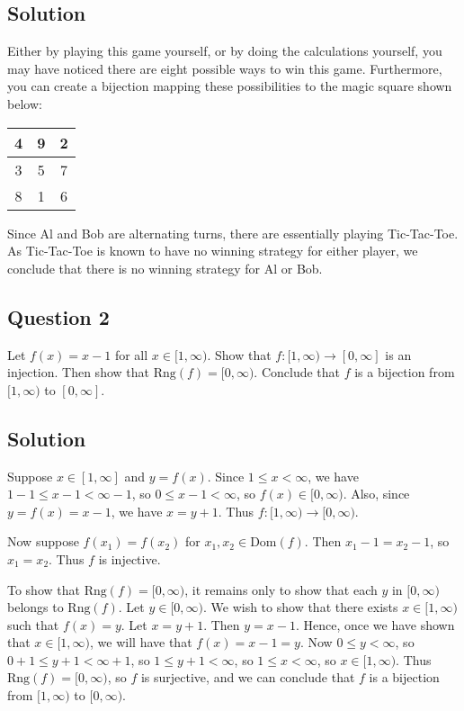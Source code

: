 \documentclass{article}
\begin{document}

\subsection*{Solution}
    Either by playing this game yourself, or by doing the calculations yourself, you may have noticed there are eight possible ways to win this game. Furthermore, you can create a bijection mapping these possibilities to the magic square shown below:
    \begin{center}
        \begin{tabular}{c|c|c}
            4 & 9 & 2 \\
             \hline
            3 & 5 & 7 \\
             \hline
            8 & 1 & 6
        \end{tabular}
    \end{center}
    Since Al and Bob are alternating turns, there are essentially playing Tic-Tac-Toe. As Tic-Tac-Toe is known to have no winning strategy for either player, we conclude that there is no winning strategy for Al or Bob.

\subsection*{Question 2}
    Let $f(x) = x - 1$ for all $x \in [1, \infty)$. Show that $f: [1, \infty) \rightarrow [0, \infty]$ is an injection. Then show that $\text{Rng}(f) = [0, \infty)$. Conclude that $f$ is a bijection from $[1, \infty)$ to $[0, \infty]$.

\subsection*{Solution}
    Suppose $x \in [1, \infty]$ and $y = f(x)$. Since $1 \le x < \infty$, we have $1 - 1 \le x - 1 < \infty - 1$, so $0 \le x - 1 < \infty$, so $f(x) \in [0, \infty)$. Also, since $y = f(x) = x - 1$, we have $x = y + 1$. Thus $f: [1, \infty) \rightarrow [0, \infty)$.
    
    \vspace{1.5mm}
    Now suppose $f(x_{1}) = f(x_{2})$ for $x_{1}, x_{2} \in \text{Dom}(f)$. Then $x_{1} - 1 = x_{2} - 1$, so $x_{1} = x_{2}$. Thus $f$ is injective.
        
    \vspace{1.5mm} To show that $\text{Rng}(f) = [0, \infty)$, it remains only to show that each $y$ in $[0, \infty)$ belongs to $\text{Rng}(f)$. Let $y \in [0, \infty)$. We wish to show that there exists $x \in [1, \infty)$ such that $f(x) = y$. Let $x = y + 1$. Then $y = x - 1$. Hence, once we have shown that $x \in [1, \infty)$, we will have that $f(x) = x - 1 = y$. Now $0 \le y < \infty$, so $0 + 1 \le y + 1 < \infty + 1$, so $1 \le y + 1 < \infty$, so $1 \le x < \infty$, so $x \in [1, \infty)$. Thus $\text{Rng}(f) = [0, \infty)$, so $f$ is surjective, and we can conclude that $f$ is a bijection from $[1, \infty)$ to $[0, \infty)$.
\end{document}
